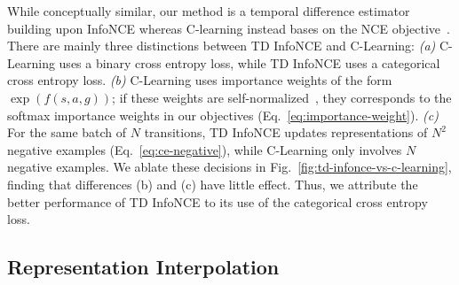 \documentclass{article} %
\begin{document}
While conceptually similar, our method is a temporal difference estimator building upon InfoNCE whereas C-learning instead bases on the NCE objective~\citep{gutmann2010noise}. There are mainly three distinctions between TD InfoNCE and C-Learning: 
\emph{(a)} C-Learning uses a binary cross entropy loss, while TD InfoNCE uses a categorical cross entropy loss.
\emph{(b)} C-Learning uses importance weights of the form $\exp(f(s, a, g))$; if these weights are self-normalized~\citep{dubi1979interpretation, hammersley1956conditional}, they corresponds to the softmax importance weights in our objectives (Eq.~\ref{eq:importance-weight}). \emph{(c)} For the same batch of $N$ transitions, TD InfoNCE updates representations of $N^2$ negative examples (Eq.~\ref{eq:ce-negative}), while C-Learning only involves $N$ negative examples.
We ablate these decisions in Fig.~\ref{fig:td-infonce-vs-c-learning}, finding that differences (b) and (c) have little effect. Thus, we attribute the better performance of TD InfoNCE to its use of the categorical cross entropy loss.



\subsection{Representation Interpolation}
\label{appendix:latent-interp}
\end{document}
